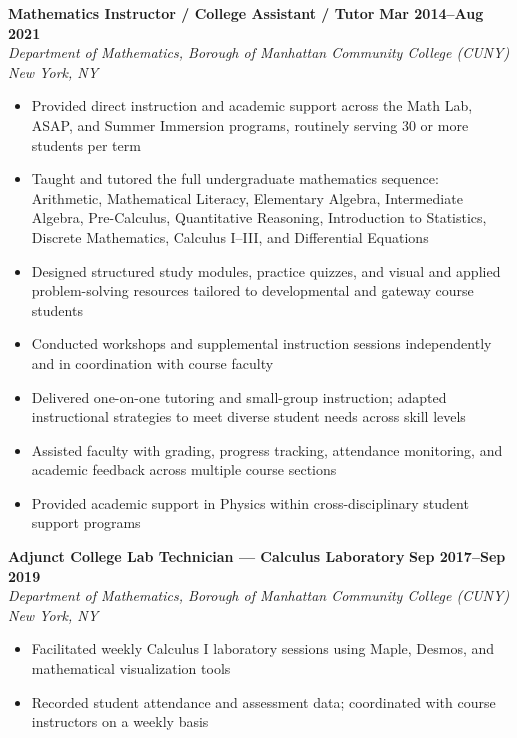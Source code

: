 \documentclass[a4paper, 11pt]{article}
\newcommand{\entryvspace}{\vspace{9pt}}
\begin{document}
\noindent\textbf{Mathematics Instructor / College Assistant / Tutor}%
  \hfill\textbf{Mar 2014--Aug 2021}\\
\textit{Department of Mathematics, Borough of Manhattan Community College (CUNY)}%
  \hfill\textit{New York, NY}
\begin{itemize}
  \item Provided direct instruction and academic support across the Math Lab, ASAP,
        and Summer Immersion programs, routinely serving 30 or more students per term
  \item Taught and tutored the full undergraduate mathematics sequence: Arithmetic,
        Mathematical Literacy, Elementary Algebra, Intermediate Algebra, Pre-Calculus,
        Quantitative Reasoning, Introduction to Statistics, Discrete Mathematics,
        Calculus I--III, and Differential Equations
  \item Designed structured study modules, practice quizzes, and visual and applied
        problem-solving resources tailored to developmental and gateway course students
  \item Conducted workshops and supplemental instruction sessions independently and
        in coordination with course faculty
  \item Delivered one-on-one tutoring and small-group instruction; adapted
        instructional strategies to meet diverse student needs across skill levels
  \item Assisted faculty with grading, progress tracking, attendance monitoring, and
        academic feedback across multiple course sections
  \item Provided academic support in Physics within cross-disciplinary student
        support programs
\end{itemize}

\entryvspace

\noindent\textbf{Adjunct College Lab Technician --- Calculus Laboratory}%
  \hfill\textbf{Sep 2017--Sep 2019}\\
\textit{Department of Mathematics, Borough of Manhattan Community College (CUNY)}%
  \hfill\textit{New York, NY}
\begin{itemize}
  \item Facilitated weekly Calculus I laboratory sessions using Maple, Desmos, and
        mathematical visualization tools
  \item Recorded student attendance and assessment data; coordinated with course
        instructors on a weekly basis
\end{itemize}
\end{document}
